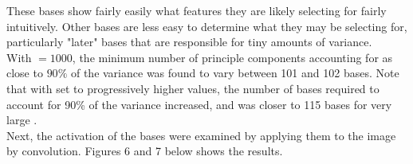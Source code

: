 \documentclass[12pt]{article}
\begin{document}
These bases show fairly easily what features they are likely selecting for fairly intuitively. Other bases are less easy to determine what they may be selecting for, particularly "later" bases that are responsible for tiny amounts of variance.\\
With {\selectfont{nsamp}} $= 1000$, the minimum number of principle components accounting for as close to $90\%$ of the variance was found to vary between 101 and 102 bases. Note that with {\selectfont{nsamp}} set to progressively higher values, the number of bases required to account for 90\% of the variance increased, and was closer to 115 bases for very large {\selectfont{nsamp}}.\\
Next, the activation of the bases were examined by applying them to the image by convolution. Figures 6 and 7 below shows the results.\\
\end{document}
